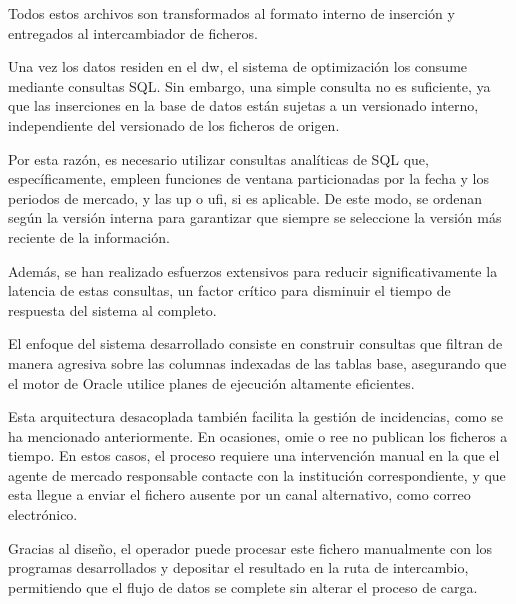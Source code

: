 Todos estos archivos son transformados al formato interno de inserción y entregados al intercambiador de ficheros.

Una vez los datos residen en el \gls{dw}, el sistema de optimización los consume mediante consultas SQL\@. Sin embargo, una simple consulta no es suficiente, ya que las inserciones en la base de datos están sujetas a un versionado interno, independiente del versionado de los ficheros de origen.

Por esta razón, es necesario utilizar consultas analíticas de SQL que, específicamente, empleen funciones de ventana particionadas por la fecha y los periodos de mercado, y las \gls{up} o \gls{ufi}, si es aplicable. De este modo, se ordenan según la versión interna para garantizar que siempre se seleccione la versión más reciente de la información.

Además, se han realizado esfuerzos extensivos para reducir significativamente la latencia de estas consultas, un factor crítico para disminuir el tiempo de respuesta del sistema al completo.

El enfoque del sistema desarrollado consiste en construir consultas que filtran de manera agresiva sobre las columnas indexadas de las tablas base, asegurando que el motor de Oracle utilice planes de ejecución altamente eficientes.

Esta arquitectura desacoplada también facilita la gestión de incidencias, como se ha mencionado anteriormente. En ocasiones, \gls{omie} o \gls{ree} no publican los ficheros a tiempo. En estos casos, el proceso requiere una intervención manual en la que el agente de mercado responsable contacte con la institución correspondiente, y que esta llegue a enviar el fichero ausente por un canal alternativo, como correo electrónico.

Gracias al diseño, el operador puede procesar este fichero manualmente con los programas desarrollados y depositar el resultado en la ruta de intercambio, permitiendo que el flujo de datos se complete sin alterar el proceso de carga.
